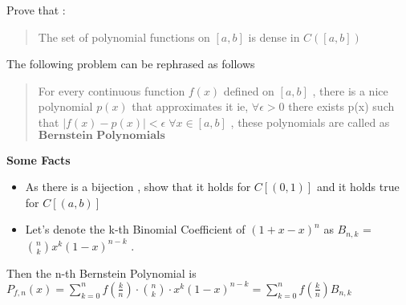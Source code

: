 \documentclass[
  letterpaper,
  DIV=11,
  numbers=noendperiod]{scrreprt}
\providecommand{\tightlist}{%
  \setlength{\itemsep}{0pt}\setlength{\parskip}{0pt}}\usepackage{longtable,booktabs,array}
\begin{document}
\begin{tcolorbox}
\begin{tcolorbox}
Prove that :

\begin{quote}
The set of polynomial functions on \([a,b]\) is dense in \(C([a,b])\)
\end{quote}

\begin{tcolorbox}[enhanced jigsaw, colframe=quarto-callout-tip-color-frame, coltitle=black, bottomtitle=1mm, toprule=.15mm, breakable, title=\textcolor{quarto-callout-tip-color}{\faLightbulb}\hspace{0.5em}{Hints}, rightrule=.15mm, titlerule=0mm, toptitle=1mm, opacityback=0, arc=.35mm, left=2mm, bottomrule=.15mm, leftrule=.75mm, opacitybacktitle=0.6, colback=white, colbacktitle=quarto-callout-tip-color!10!white]

The following problem can be rephrased as follows

\begin{quote}
For every continuous function \(f(x)\) defined on \([a,b]\) , there is a
nice polynomial \(p(x)\) that approximates it ie,
\(\forall \epsilon > 0\) there exists p(x) such that
\(|f(x) - p(x)| < \epsilon \; \forall x \in [a,b]\) , these polynomials
are called as \(\textbf{Bernstein Polynomials}\)
\end{quote}

\begin{tcolorbox}[enhanced jigsaw, toprule=.15mm, colframe=quarto-callout-color-frame, breakable, bottomrule=.15mm, rightrule=.15mm, opacityback=0, left=2mm, leftrule=.75mm, colback=white, arc=.35mm]

\vspace{-3mm}\textbf{Some Facts}\vspace{3mm}

\begin{itemize}
\tightlist
\item
  As there is a bijection , show that it holds for \(C[(0,1)]\) and it
  holds true for \(C[(a,b)]\)
\item
  Let's denote the k-th Binomial Coefficient of \((1+x-x)^n\) as
  \(B_{n,k}\) = \(\binom{n}{k} x^k ({1-x})^{n-k}\) .
\end{itemize}

Then the n-th Bernstein Polynomial is
\(P_{f,n}(x)= \sum_{k=0}^{n} f\left(\frac{k}{n}\right) \cdot \binom{n}{k} \cdot x^k (1-x)^{n-k} = \sum_{k=0}^{n} f\left(\frac{k}{n}\right)B_{n,k}\)

\end{tcolorbox}

\end{tcolorbox}


\end{tcolorbox}
\end{tcolorbox}
\end{document}
